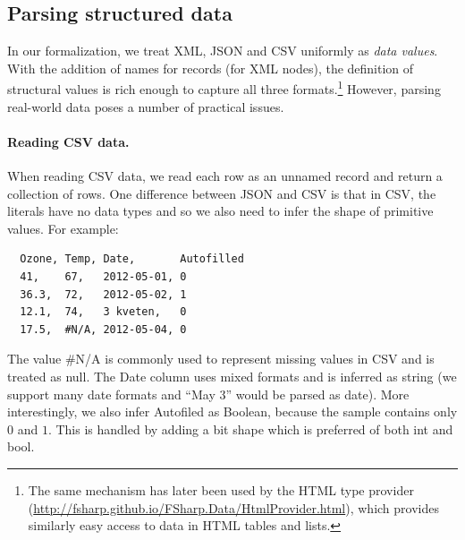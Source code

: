 \documentclass[10pt,nocopyrightspace]{sigplanconf}
\newcommand{\kvd}[1]{\textnormal{\textcolor{kvdclr}{\sffamily #1}}}
\newcommand{\ident}[1]{\textnormal{\sffamily #1}}
\begin{document}
\subsection{Parsing structured data}
\label{sec:impl-parsing}

In our formalization, we treat XML, JSON and CSV uniformly as \emph{data values}. With the addition of
names for records (for XML nodes), the definition of structural values is rich enough to capture all
three formats.\footnote{The same mechanism has later been used by the HTML type provider
(\url{http://fsharp.github.io/FSharp.Data/HtmlProvider.html}), which provides similarly easy
access to data in HTML tables and lists.} However, parsing real-world data poses a number of practical issues.

\paragraph{Reading CSV data.}
When reading CSV data, we read each row as an unnamed record and return a collection of rows.
One difference between JSON and CSV is that in CSV, the literals have no data types and so
we also need to infer the shape of primitive values. For example:
%
{\small{
\begin{verbatim}
  Ozone, Temp, Date,       Autofilled
  41,    67,   2012-05-01, 0
  36.3,  72,   2012-05-02, 1
  12.1,  74,   3 kveten,   0
  17.5,  #N/A, 2012-05-04, 0
\end{verbatim}
}}
%
\noindent
The value {\small\ttfamily \#N/A} is commonly used to represent missing values in CSV and is treated
as \kvd{null}. The \ident{Date} column uses mixed formats and is inferred as \ident{string}
(we support many date formats and ``May 3'' would be parsed as date). More interestingly,
we also infer \ident{Autofiled} as Boolean, because the sample contains only $0$ and $1$.
This is handled by adding a \ident{bit} shape which is preferred of both \ident{int} and \ident{bool}.
\end{document}
